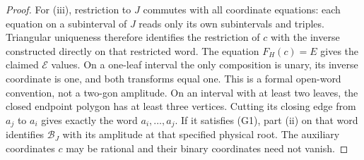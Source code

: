 \begin{proof}
For (iii), restriction to $J$ commutes with all coordinate equations:
each equation on a subinterval of $J$ reads only its own subintervals
and triples. Triangular uniqueness therefore identifies the restriction
of $c$ with the inverse constructed directly on that restricted word.
The equation $F_H(c)=E$ gives the claimed $\mathcal E$ values.
On a one-leaf interval the only composition is unary, its inverse
coordinate is one, and both transforms equal one. This is a formal
open-word convention, not a two-gon amplitude.
On an interval with at least two leaves, the closed endpoint polygon
has at least three vertices. Cutting its closing edge from $a_j$ to
$a_i$ gives exactly the word $a_i,\ldots,a_j$. If it satisfies (G1),
part (ii) on that word identifies $\mathcal B_J$ with its amplitude
at that specified physical root. The auxiliary coordinates $c$ may be
rational and their binary coordinates need not vanish.
\end{proof}

